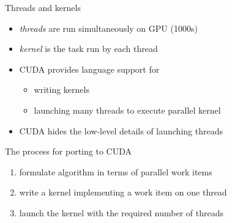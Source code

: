 
\begin{frame}[fragile]{}
    \begin{info}{Threads and kernels}
        \begin{itemize}
            \item \emph{threads} are run simultaneously on GPU (1000s)
            \item \emph{kernel} is the task run by each thread
            \item CUDA provides language support for
            \begin{itemize}
                \item writing kernels
                \item launching many threads to execute parallel kernel
            \end{itemize}
            \item CUDA hides the low-level details of launching threads
        \end{itemize}
    \end{info}
    \begin{info}{The process for porting to CUDA}
        \begin{enumerate}
            \item formulate algorithm in terms of parallel work items
            \item write a kernel implementing a work item on one thread
            \item launch the kernel with the required number of threads
        \end{enumerate}
    \end{info}

\end{frame}

